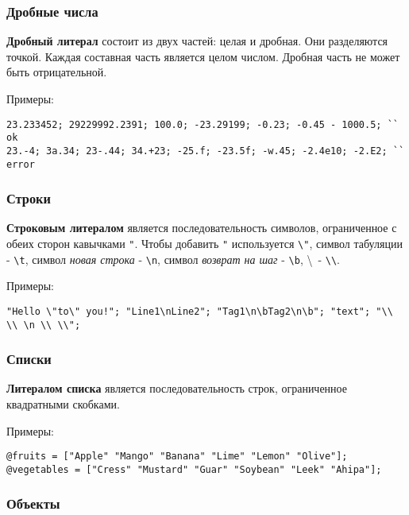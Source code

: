 \documentclass[a4paper, 14pt]{extarticle}
\begin{document}
\subsubsection{Дробные числа}

{\bf Дробный литерал} состоит из двух частей: целая и дробная. Они разделяются точкой. Каждая составная часть является целом числом. Дробная часть не может быть отрицательной.
	
\noindent Примеры:
\begin{lstlisting}[numbers=none]
23.233452; 29229992.2391; 100.0; -23.29199; -0.23; -0.45 - 1000.5; `` ok
23.-4; 3а.34; 23-.44; 34.+23; -25.f; -23.5f; -w.45; -2.4e10; -2.E2; `` error 
\end{lstlisting}

\subsubsection{Строки}

{\bf Строковым литералом} является последовательность символов, ограниченное с обеих сторон кавычками \lstinline`"`. Чтобы добавить \lstinline`"` используется \lstinline`\"`, символ табуляции - \lstinline`\t`, символ {\it новая строка} - \lstinline`\n`, символ {\it возврат на шаг} - \lstinline`\b`, \textbackslash \ - \lstinline`\\`.

\noindent Примеры:
\begin{lstlisting}[numbers=none]
"Hello \"to\" you!"; "Line1\nLine2"; "Tag1\n\bTag2\n\b"; "text"; "\\ \\ \n \\ \\";
\end{lstlisting}

\subsubsection{Списки}

{\bf Литералом списка} является последовательность строк, ограниченное квадратными скобками.

\noindent Примеры:
\begin{lstlisting}[numbers=none]
@fruits = ["Apple" "Mango" "Banana" "Lime" "Lemon" "Olive"];
@vegetables = ["Cress" "Mustard" "Guar" "Soybean" "Leek" "Ahipa"];
\end{lstlisting}

\subsubsection{Объекты}
\end{document}
